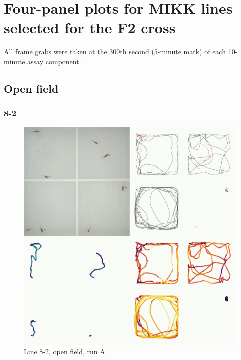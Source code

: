 \documentclass[
]{book}
\begin{document}
\hypertarget{four-panel-app}{%
\section{Four-panel plots for MIKK lines selected for the F2 cross}\label{four-panel-app}}

All frame grabs were taken at the 300th second (5-minute mark) of each 10-minute assay component.

\hypertarget{open-field}{%
\subsection{Open field}\label{open-field}}

\hypertarget{section-1}{%
\subsubsection{8-2}\label{section-1}}



\begin{figure}
\includegraphics[width=1\linewidth]{figs/mikk_behaviour/four_panel_plots/open_field_20191114_1040_8-2_L_A_300} \caption{Line 8-2, open field, run A.}\label{fig:4p-8-2-of-A}
\end{figure}
\end{document}
